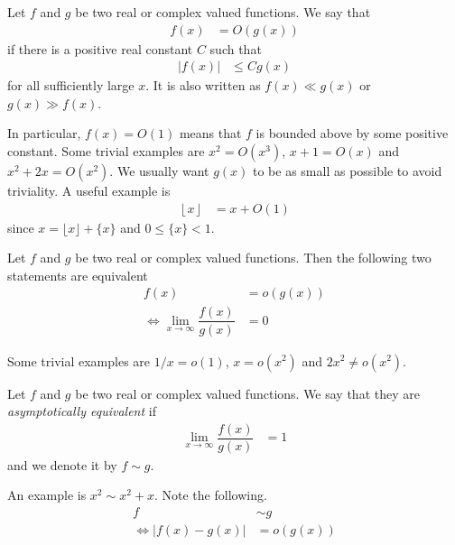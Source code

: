 \documentclass[elemannt.tex]{subfile}
\begin{document}
		\begin{definition}[Big O]
			Let $f$ and $g$ be two real or complex valued functions. We say that
				\begin{align*}
					f(x)
					& = O(g(x))
				\end{align*}
			if there is a positive real constant $C$ such that
				\begin{align*}
					|f(x)|
					& \leq Cg(x)
				\end{align*}
			for all sufficiently large $x$. It is also written as $f(x)\ll g(x)$  or $g(x)\gg f(x)$.
		\end{definition}
	In particular, $f(x)=O(1)$ means that $f$ is bounded above by some positive constant. Some trivial examples are $x^{2}=O(x^{3})$, $x+1=O(x)$ and $x^{2}+2x=O(x^{2})$. We usually want $g(x)$ to be as small as possible to avoid triviality. A useful example is
		\begin{align*}
			\left\lfloor{x}\right\rfloor
				& = x+O(1)
		\end{align*}
	since $x=\lfloor{x}\rfloor+\{x\}$ and $0\leq \{x\}<1$.
		\begin{definition}[Small O]
			Let $f$ and $g$ be two real or complex valued functions. Then the following two statements are equivalent
				\begin{align*}
					f(x)
						& = o(g(x))\\
					\iff \lim\limits_{x\to\infty}\dfrac{f(x)}{g(x)}
						& = 0
				\end{align*}
		\end{definition}
	Some trivial examples are $1/x=o(1)$, $x=o(x^{2})$ and $2x^{2}\neq o(x^{2})$.
		\begin{definition}[Equivalence]
			Let $f$ and $g$ be two real or complex valued functions. We say that they are \textit{asymptotically equivalent} if
				\begin{align*}
					\lim\limits_{x\to\infty}\dfrac{f(x)}{g(x)}
						& = 1
				\end{align*}
			and we denote it by $f\sim g$.
		\end{definition}
	An example is $x^{2}\sim x^{2}+x$. Note the following.
		\begin{align*}
			f
				& \sim g\\
			\iff |f(x)-g(x)|
				& = o(g(x))
		\end{align*}
\end{document}
